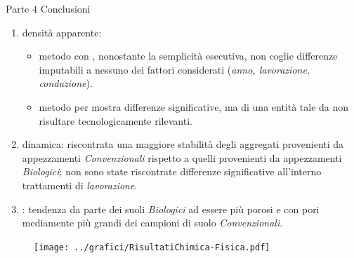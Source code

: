 \documentclass[10pt]{beamer}
\begin{document}
\begin{frame}[label=finale]{Parte 4 \small{Conclusioni}}
  \begin{enumerate}[<+->]

  \item densità apparente:
    \begin{itemize}
    \item metodo con \hyperlink{Core}{}, nonostante la semplicità esecutiva,
      non coglie differenze imputabili a nessuno dei fattori considerati
      (\emph{anno, lavorazione, conduzione}).
    \item metodo per \hyperlink{Clod}{} mostra differenze significative, ma di
      una entità tale da non risultare tecnologicamente rilevanti.
    \end{itemize}
  \item \hyperlink{distribuzione}{} dinamica: riscontrata una
    maggiore stabilità degli aggregati provenienti da appezzamenti
    \emph{Convenzionali} rispetto a quelli provenienti da appezzamenti
    \emph{Biologici}; non sono state riscontrate differenze significative
    all'interno trattamenti di \emph{lavorazione}.
  \item \hyperlink{Porosimetria}{}: tendenza da parte dei suoli
    \emph{Biologici} ad essere più porosi e con pori mediamente più
    grandi dei campioni di suolo \emph{Convenzionali}.
  \end{enumerate}

\end{frame}




\begin{frame}
\end{frame}

\appendix

\begin{frame}
\vspace{1.5cm}
\begin{figure}
\centering
\texttt{[image: ../grafici/RisultatiChimica-Fisica.pdf]}
\end{figure}
\end{frame}
\end{document}
